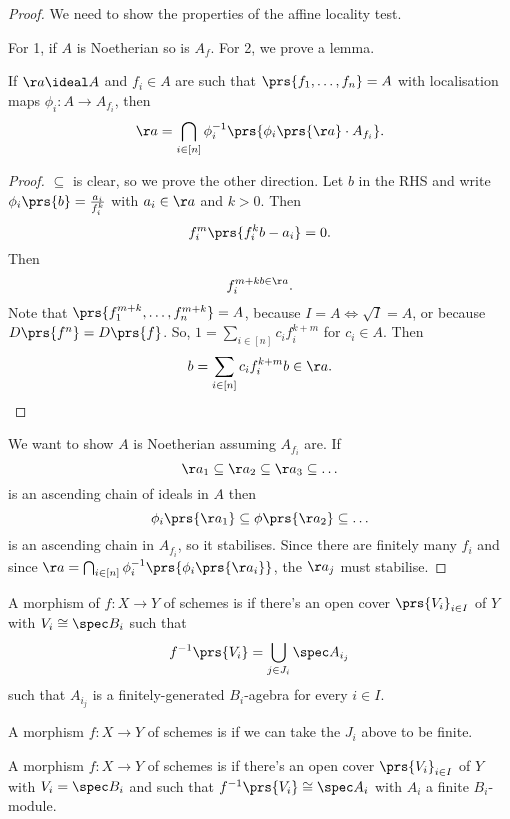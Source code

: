 \documentclass[10pt,a4paper,twoside,openany,hidelinks]{book}
\begin{document}
\begin{proof}
We need to show the properties of the affine locality test.

For 1, if $A$ is Noetherian so is $A_f$.
For 2, we prove a lemma.
\begin{lemma}
If $\aa \ideal A$ and $f_i \in A$ are such that $\prs{f_1, \ldots, f_n} = A$ with localisation maps $\phi_i \colon A \to A_{f_i}$, then
$$\aa = \bigcap_{i \in [n]} \phi_i^{-1}\prs{\phi_i\prs{\aa} \cdot A_{f_i}} \text{.}$$
\end{lemma}
\begin{proof}
$\subseteq$ is clear, so we prove the other direction. Let $b$ in the RHS and write $\phi_i\prs{b} = \frac{a_i}{f_i^k}$ with $a_i \in \aa$ and $k > 0$.
Then
$$f_i^m\prs{f_i^k b - a_i} = 0 \text{.}$$
Then
$$f_i^{m+k b \in \aa} \text{.}$$
Note that $\prs{f_1^{m+k}, \ldots, f_n^{m+k}} = A$, because $I=A \iff \sqrt{I} = A$, or because $D\prs{f^n} = D\prs{f}$.
So, $1 = \sum_{i \in [n]}c_i f_i^{k+m}$ for $c_i \in A$.
Then $$b = \sum_{i \in [n]} c_i f_i^{k+m}b \in \aa \text{.}$$
\end{proof}

We want to show $A$ is Noetherian assuming $A_{f_i}$ are.
If $$\aa_1 \subseteq \aa_2 \subseteq \aa_3 \subseteq \ldots$$
is an ascending chain of ideals in $A$ then
$$\phi_i\prs{\aa_1} \subseteq \phi\prs{\aa_2} \subseteq \ldots$$
is an ascending chain in $A_{f_i}$, so it stabilises.
Since there are finitely many $f_i$ and since $\aa = \bigcap_{i \in [n]} \phi_i^{-1}\prs{\phi_i\prs{\aa_i}}$, the $\aa_j$ must stabilise.
\end{proof}

\begin{definition}
A morphism of $f \colon X \to Y$ of schemes is  if there's an open cover $\prs{V_i}_{i \in I}$ of $Y$ with $V_i \cong \spec B_i$ such that
$$f^{-1}\prs{V_i} = \bigcup_{j \in J_i} \spec A_{i_j}$$
such that $A_{i_j}$ is a finitely-generated $B_i$-agebra for every $i \in I$.
\end{definition}

\begin{definition}
A morphism $f \colon X \to Y$ of schemes is  if we can take the $J_i$ above to be finite.
\end{definition}

\begin{definition}
A morphism $f \colon X \to Y$ of schemes is  if there's an open cover $\prs{V_i}_{i \in I}$ of $Y$ with $V_i = \spec B_i$ and such that $f^{-1}\prs{V_i} \cong \spec A_i$ with $A_i$ a finite $B_i$-module.
\end{definition}
\end{document}
